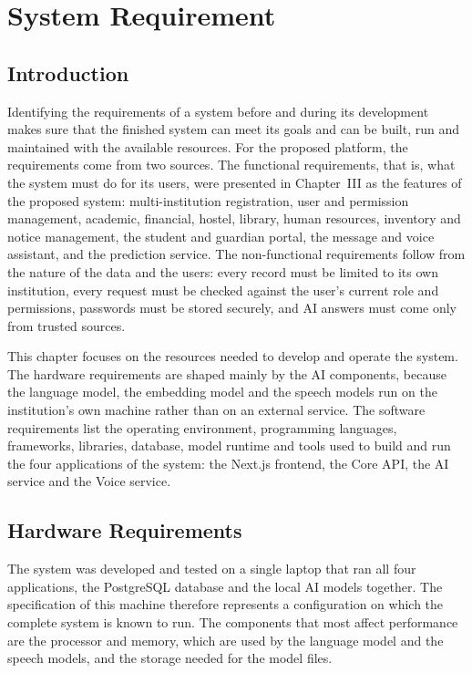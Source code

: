 \chapter{System Requirement}

\section{Introduction}
Identifying the requirements of a system before and during its development makes sure that the finished system can meet its goals and can be built, run and maintained with the available resources. For the proposed platform, the requirements come from two sources. The functional requirements, that is, what the system must do for its users, were presented in Chapter~III as the features of the proposed system: multi-institution registration, user and permission management, academic, financial, hostel, library, human resources, inventory and notice management, the student and guardian portal, the message and voice assistant, and the prediction service. The non-functional requirements follow from the nature of the data and the users: every record must be limited to its own institution, every request must be checked against the user's current role and permissions, passwords must be stored securely, and AI answers must come only from trusted sources.

This chapter focuses on the resources needed to develop and operate the system. The hardware requirements are shaped mainly by the AI components, because the language model, the embedding model and the speech models run on the institution's own machine rather than on an external service. The software requirements list the operating environment, programming languages, frameworks, libraries, database, model runtime and tools used to build and run the four applications of the system: the Next.js frontend, the Core API, the AI service and the Voice service.

\section{Hardware Requirements}
The system was developed and tested on a single laptop that ran all four applications, the PostgreSQL database and the local AI models together. The specification of this machine therefore represents a configuration on which the complete system is known to run. The components that most affect performance are the processor and memory, which are used by the language model and the speech models, and the storage needed for the model files.

